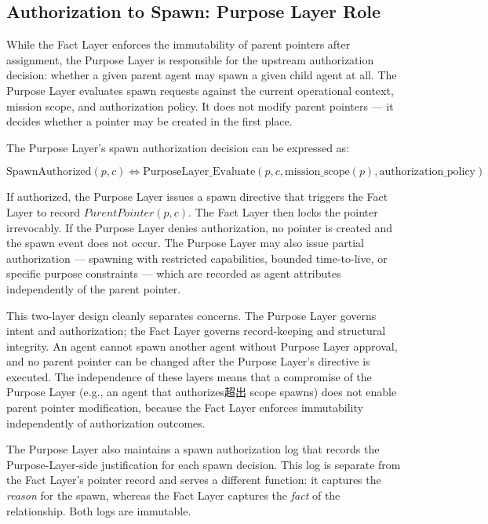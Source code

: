 \subsection{Authorization to Spawn: Purpose Layer Role}

While the Fact Layer enforces the immutability of parent pointers after assignment, the Purpose Layer is responsible for the upstream authorization decision: whether a given parent agent may spawn a given child agent at all. The Purpose Layer evaluates spawn requests against the current operational context, mission scope, and authorization policy. It does not modify parent pointers — it decides whether a pointer may be created in the first place.

The Purpose Layer's spawn authorization decision can be expressed as:

\[
\text{SpawnAuthorized}(p, c) \iff \text{PurposeLayer\_Evaluate}(p, c, \text{mission\_scope}(p), \text{authorization\_policy})
\]

If authorized, the Purpose Layer issues a spawn directive that triggers the Fact Layer to record $\textit{ParentPointer}(p, c)$. The Fact Layer then locks the pointer irrevocably. If the Purpose Layer denies authorization, no pointer is created and the spawn event does not occur. The Purpose Layer may also issue partial authorization — spawning with restricted capabilities, bounded time-to-live, or specific purpose constraints — which are recorded as agent attributes independently of the parent pointer.

This two-layer design cleanly separates concerns. The Purpose Layer governs intent and authorization; the Fact Layer governs record-keeping and structural integrity. An agent cannot spawn another agent without Purpose Layer approval, and no parent pointer can be changed after the Purpose Layer's directive is executed. The independence of these layers means that a compromise of the Purpose Layer (e.g., an agent that authorizes超出 scope spawns) does not enable parent pointer modification, because the Fact Layer enforces immutability independently of authorization outcomes.

The Purpose Layer also maintains a spawn authorization log that records the Purpose-Layer-side justification for each spawn decision. This log is separate from the Fact Layer's pointer record and serves a different function: it captures the \emph{reason} for the spawn, whereas the Fact Layer captures the \emph{fact} of the relationship. Both logs are immutable.

